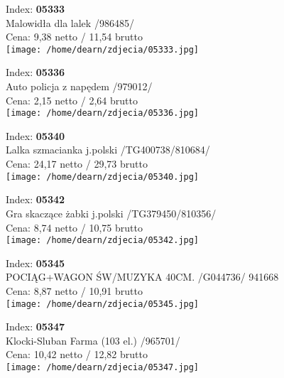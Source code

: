 {Index: \textbf{05333}\\
Malowidła dla lalek  /986485/\\
Cena: 9,38 netto / 11,54 brutto\\
  \texttt{[image: /home/dearn/zdjecia/05333.jpg]}}\newline\newline

{Index: \textbf{05336}\\
Auto policja z napędem  /979012/\\
Cena: 2,15 netto / 2,64 brutto\\
  \texttt{[image: /home/dearn/zdjecia/05336.jpg]}}\newline\newline

{Index: \textbf{05340}\\
Lalka szmacianka j.polski /TG400738/810684/\\
Cena: 24,17 netto / 29,73 brutto\\
  \texttt{[image: /home/dearn/zdjecia/05340.jpg]}}\newline\newline

{Index: \textbf{05342}\\
Gra skaczące żabki j.polski /TG379450/810356/\\
Cena: 8,74 netto / 10,75 brutto\\
  \texttt{[image: /home/dearn/zdjecia/05342.jpg]}}\newline\newline

{Index: \textbf{05345}\\
POCIĄG+WAGON ŚW/MUZYKA 40CM. /G044736/          941668\\
Cena: 8,87 netto / 10,91 brutto\\
  \texttt{[image: /home/dearn/zdjecia/05345.jpg]}}\newline\newline

{Index: \textbf{05347}\\
Klocki-Sluban Farma (103 el.)   /965701/\\
Cena: 10,42 netto / 12,82 brutto\\
  \texttt{[image: /home/dearn/zdjecia/05347.jpg]}}\newline\newline

